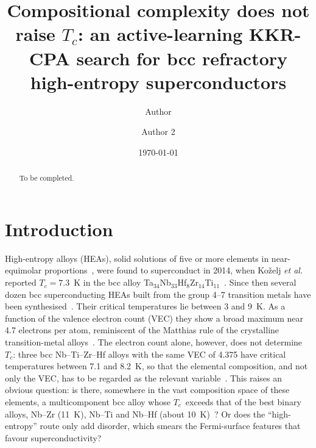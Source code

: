 \documentclass[aps,prb,reprint,superscriptaddress,twocolumn,floatfix]{revtex4-2}
\newcommand{\Tc}{$T_c$}
\begin{document}
\title{Compositional complexity does not raise $T_c$: an active-learning KKR-CPA search for bcc refractory high-entropy superconductors}

\author{Author}
\author{Author 2}

\date{\today}

\begin{abstract}
To be completed.
\end{abstract}

\maketitle

\section{Introduction}

High-entropy alloys (HEAs), solid solutions of five or more elements in near-equimolar
proportions~\cite{Yeh2004,Cantor2004}, were found to superconduct in 2014, when
Ko\v{z}elj \emph{et al.} reported $T_c = 7.3$~K in the bcc alloy
Ta$_{34}$Nb$_{33}$Hf$_8$Zr$_{14}$Ti$_{11}$~\cite{Kozelj2014}. Since then several dozen
bcc superconducting HEAs built from the group 4--7 transition metals have been
synthesised~\cite{SunCava2019,Kitagawa2020}. Their critical temperatures lie between 3 and
9~K. As a function of the valence electron count (VEC) they show a broad maximum near 4.7
electrons per atom, reminiscent of the Matthias rule of the crystalline transition-metal
alloys~\cite{Matthias1955,Hulm1961,lit_vonRohr_15926113}. The electron count alone, however,
does not determine \Tc: three bcc Nb--Ti--Zr--Hf alloys with the same VEC of 4.375 have
critical temperatures between 7.1 and 8.2~K, so that the elemental composition, and not
only the VEC, has to be regarded as the relevant variable~\cite{lit_Idczak_fnz7bzmw}. This
raises an obvious question: is there, somewhere in the vast composition space of these elements, a
multicomponent bcc alloy whose \Tc\ exceeds that of the best binary alloys, Nb--Zr
(11~K), Nb--Ti and Nb--Hf (about 10~K)~\cite{Hulm1961,Kushwaha2025}? Or does the
``high-entropy'' route only add disorder, which smears the Fermi-surface features that
favour superconductivity?
\end{document}
